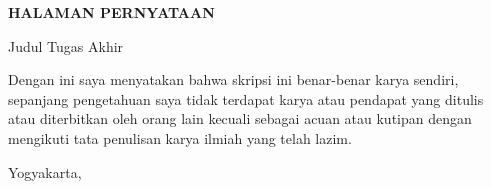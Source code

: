 
\begin{center}
    {\textbf{HALAMAN PERNYATAAN}}\par
    \vspace{0.4cm}
    {Judul Tugas Akhir}\par
    \vspace{0.4cm}
    
    {\textbf{\ThesisTitle}}\par
    \vspace{0.4cm}
\end{center}

{\setlength{\parindent}{0pt}
\setlength{\parskip}{0.5em}
\sloppy{} 

\noindent Dengan ini saya menyatakan bahwa skripsi ini benar-benar karya sendiri, sepanjang pengetahuan saya tidak terdapat karya atau pendapat yang ditulis atau diterbitkan oleh orang lain kecuali sebagai acuan atau kutipan dengan mengikuti tata penulisan karya ilmiah yang telah lazim.

}

\vspace{1cm}

\begin{flushright}
    {Yogyakarta, \TanggalPernyataan}\par

    \vspace{2.5cm}

    {\AuthorName} \\
    {\AuthorNIM}
\end{flushright}
\newpage